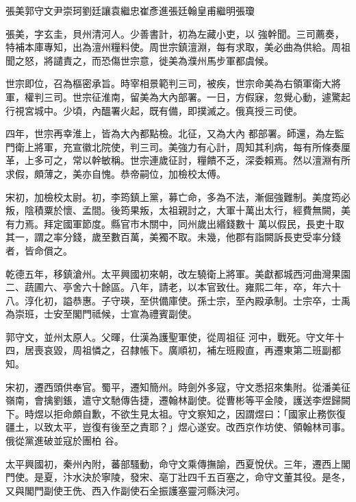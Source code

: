 
\begin{pinyinscope}

 張美郭守文尹崇珂劉廷讓袁繼忠崔彥進張廷翰皇甫繼明張瓊



 張美，字玄圭，貝州清河人。少善書計，初為左藏小吏，以
 強幹聞。三司薦奏，特補本庫專知，出為澶州糧料使。周世宗鎮澶淵，每有求取，美必曲為供給。周祖聞之怒，將譴責之，而恐傷世宗意，徙美為濮州馬步軍都虞候。



 世宗即位，召為樞密承旨。時宰相景範判三司，被疾，世宗命美為右領軍衛大將軍，權判三司。世宗征淮南，留美為大內部署。一日，方假寐，忽覺心動，遽驚起行視宮城中。少頃，內醞署火起，既有備，即撲滅之。俄真授三司使。



 四年，世宗再幸淮上，皆為大內都點檢。北征，又為大內
 都部署。師還，為左監門衛上將軍，充宣徽北院使，判三司。美強力有心計，周知其利病，每有所條奏厘革，上多可之，常以幹敏稱。世宗連歲征討，糧饋不乏，深委賴焉。然以澶淵有所求假，頗薄之，美亦自愧。恭帝嗣位，加檢校太傅。



 宋初，加檢校太尉。初，李筠鎮上黨，募亡命，多為不法，漸倔強難制。美度筠必叛，陰積粟於懷、孟間。後筠果叛，太祖親討之，大軍十萬出太行，經費無闕，美有力焉。拜定國軍節度。縣官市木關中，同州歲出緡錢數十
 萬以假民，長吏十取其一，謂之率分錢，歲至數百萬，美獨不取。未幾，他郡有詣闕訴長吏受率分錢者，皆命償之。



 乾德五年，移鎮滄州。太平興國初來朝，改左驍衛上將軍。美獻都城西河曲灣果園二、蔬圃六、亭舍六十餘區。八年，請老，以本官致仕。雍熙二年，卒，年六十八。淳化初，謚恭惠。子守瑛，至供備庫使。孫士宗，至內殿承制。士宗卒，士禹為崇班，士安至閣門祗候，士宣為禮賓副使。



 郭守文，並州太原人。父暉，仕漢為護聖軍使，從周祖征
 河中，戰死。守文年十四，居喪哀毀，周祖憐之，召隸帳下。廣順初，補左班殿直，再遷東第二班副都知。



 宋初，遷西頭供奉官。蜀平，遷知簡州。時劍外多寇，守文悉招來集附。從潘美征嶺南，會擒劉鋹，遣守文馳傳告捷，遷翰林副使。從曹彬等平金陵，護送李煜歸闕下。時煜以拒命頗自歉，不欲生見太祖。守文察知之，因謂煜曰：「國家止務恢復疆土，以致太平，豈復有後至之責耶？」煜心遂安。改西京作坊使、領翰林司事。俄從黨進破並寇於團柏
 谷。



 太平興國初，秦州內附，蕃部騷動，命守文乘傳撫諭，西夏悅伏。三年，遷西上閣門使。是夏，汴水決於寧陵，發宋、亳丁壯四千五百塞之，命守文董其役。是冬，又與閣門副使王侁、西入作副使石全振護塞靈河縣決河。




\end{pinyinscope}
